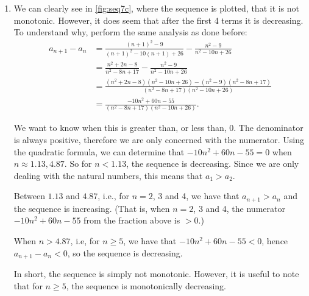 {\begin{enumerate}
Since $a_{n+1}-a_n>0$ for all $n$, we conclude the sequence is increasing.

\item
%
%
	We can clearly see in \autoref{fig:seq7c}, where the sequence is plotted, that it is not monotonic. However, it does seem that after the first 4 terms it is decreasing. To understand why, perform the same analysis as done before:
\begin{align*}
	a_{n+1}-a_n &= \frac{(n+1)^2-9}{(n+1)^2-10(n+1)+26} - \frac{n^2-9}{n^2-10n+26} \\	
	&= \frac{n^2+2n-8}{n^2-8n+17}-\frac{n^2-9}{n^2-10n+26}\\
	&= \frac{(n^2+2n-8)(n^2-10n+26)-(n^2-9)(n^2-8n+17)}{(n^2-8n+17)(n^2-10n+26)}\\
	&= \frac{-10n^2+60n-55}{(n^2-8n+17)(n^2-10n+26)}.
\end{align*}

We want to know when this is greater than, or less than, 0. The denominator is always positive, therefore we are only concerned with the numerator. Using the quadratic formula, we can determine that $-10n^2+60n-55=0$ when $n\approx 1.13, 4.87$. So for $n<1.13$, the sequence is decreasing. Since we are only dealing with the natural numbers, this means that $a_1 > a_2$.

Between $1.13$ and $4.87$, i.e., for $n=2$, 3 and 4, we have that $a_{n+1}>a_n$ and the sequence is increasing. (That is, when $n=2$, 3 and 4, the numerator $-10n^2+60n-55$ from the fraction above is $>0$.)

When $n> 4.87$, i.e, for $n\geq 5$, we have that $-10n^2+60n-55<0$, hence $a_{n+1}-a_n<0$, so the sequence is decreasing.

In short, the sequence is simply not monotonic. However, it is useful to note that for $n\geq 5$, the sequence is monotonically decreasing. 


\end{enumerate}}
